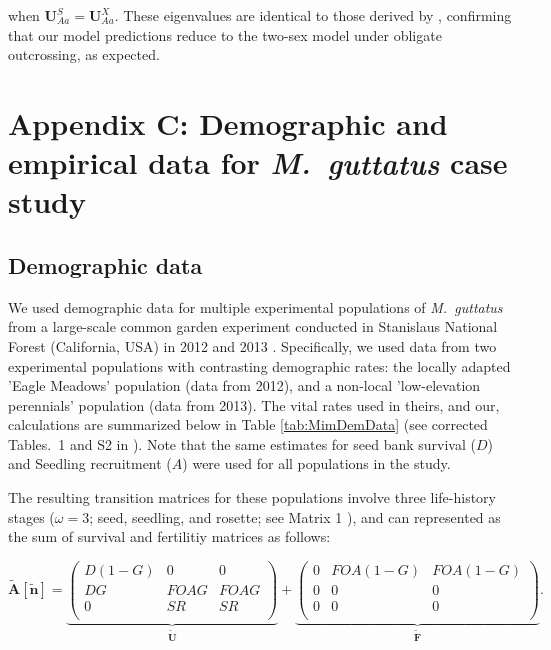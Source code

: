 \documentclass[11pt]{article}
\def\mbf#1{\mathbf{#1}}
\begin{document}
\noindent when $\mathbf{U}^S_{Aa}=\mathbf{U}^X_{Aa}$. These eigenvalues are identical to those derived by \citet{deVriesCaswell2019a}, confirming that our model predictions reduce to the two-sex model under obligate outcrossing, as expected.




\section*{Appendix C: Demographic and empirical data for {\itshape M.~guttatus} case study}
\renewcommand{\theequation}{C\arabic{equation}}
\renewcommand{\thetable}{C\arabic{table}}
\setcounter{equation}{0}  %
\setcounter{table}{0}  %


\subsection*{Demographic data}

We used demographic data for multiple experimental populations of {\itshape M.~guttatus} from a large-scale common garden experiment conducted in Stanislaus National Forest (California, USA) in 2012 and 2013 \citep{PetersonEtAl2016}. Specifically, we used data from two experimental populations with contrasting demographic rates: the locally adapted 'Eagle Meadows' population (data from 2012), and a non-local 'low-elevation perennials' population (data from 2013). The vital rates used in theirs, and our, calculations are summarized below in Table \ref{tab:MimDemData} (see corrected Tables.~1 and S2 in \citet{PetersonEtAl2016, PetersonEtAl2017}). Note that the same estimates for seed bank survival ($D$) and Seedling recruitment ($A$) were used for all populations in the study. 

The resulting transition matrices for these populations involve three life-history stages ($\omega = 3$; seed, seedling, and rosette; see Matrix 1 \citealt{PetersonEtAl2016}), and can represented as the sum of survival and fertilitiy matrices as follows:

\begin{linenomath*}
\begin{equation} \label{eq:AtildeMimulus}
	\mathbf{\tilde{A}}[\tilde{\mbf{n}}] = 
			\underbrace{\left(
			\begin{array}{ccc}
				D(1 - G) & 0 & 0 \\
				DG & FOAG & FOAG \\
				0 & SR & SR \\
			\end{array} \right)}_{\tilde{\mbf{U}}} +
			\underbrace{\left(
			\begin{array}{ccc}
				0 & FOA(1 - G) & FOA(1 - G) \\
				0 & 0 & 0 \\
				0 & 0 & 0 \\
			\end{array} \right)}_{\tilde{\mbf{F}}}.
\end{equation}
\end{linenomath*}
\end{document}
